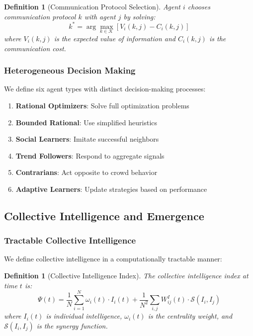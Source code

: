 \documentclass[12pt,a4paper]{article}
\newtheorem{definition}[theorem]{Definition}
\begin{document}
\begin{definition}[Communication Protocol Selection]
Agent $i$ chooses communication protocol $k$ with agent $j$ by solving:
\begin{equation}
k^* = \arg\max_{k \in \mathcal{K}} \left[V_i(k, j) - C_i(k, j)\right]
\end{equation}
where $V_i(k, j)$ is the expected value of information and $C_i(k, j)$ is the communication cost.
\end{definition}

\subsubsection{Heterogeneous Decision Making}

We define six agent types with distinct decision-making processes:

\begin{enumerate}
\item \textbf{Rational Optimizers}: Solve full optimization problems
\item \textbf{Bounded Rational}: Use simplified heuristics
\item \textbf{Social Learners}: Imitate successful neighbors
\item \textbf{Trend Followers}: Respond to aggregate signals
\item \textbf{Contrarians}: Act opposite to crowd behavior
\item \textbf{Adaptive Learners}: Update strategies based on performance
\end{enumerate}

\subsection{Collective Intelligence and Emergence}

\subsubsection{Tractable Collective Intelligence}

We define collective intelligence in a computationally tractable manner:

\begin{definition}[Collective Intelligence Index]
The collective intelligence index at time $t$ is:
\begin{equation}
\Psi(t) = \frac{1}{N} \sum_{i=1}^N \omega_i(t) \cdot I_i(t) + \frac{1}{N^2} \sum_{i,j} W_{ij}^I(t) \cdot \mathcal{S}(I_i, I_j)
\end{equation}
where $I_i(t)$ is individual intelligence, $\omega_i(t)$ is the centrality weight, and $\mathcal{S}(I_i, I_j)$ is the synergy function.
\end{definition}
\end{document}
